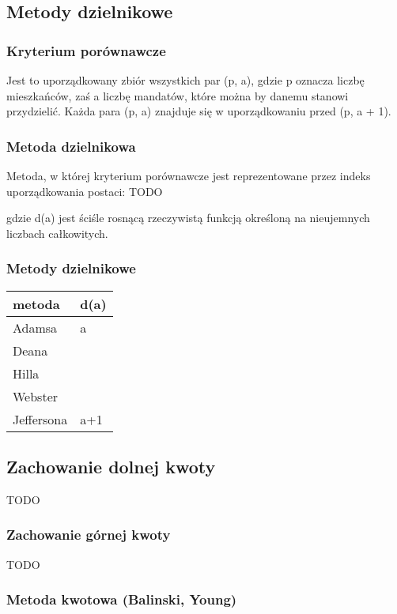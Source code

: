 \documentclass[12pt,a4paper]{article}
\begin{document}
\subsection{Metody dzielnikowe}
\subsubsection{Kryterium porównawcze}
Jest to uporządkowany zbiór wszystkich par (p, a), gdzie p oznacza liczbę mieszkańców, zaś a liczbę mandatów, które można by danemu stanowi przydzielić. Każda para (p, a) znajduje się w uporządkowaniu przed (p, a + 1).
\subsubsection{Metoda dzielnikowa}
Metoda, w której kryterium porównawcze jest reprezentowane przez indeks uporządkowania postaci:
TODO

gdzie d(a) jest ściśle rosnącą rzeczywistą funkcją określoną na nieujemnych liczbach całkowitych.

\subsubsection{Metody dzielnikowe}
\begin{center}
    \begin{tabular}{ | l  |l |}
    \hline
    metoda  & d(a) \\ \hline
    Adamsa & a \\ \hline
    Deana& \\ \hline
    Hilla & \\ \hline
    Webster & \\ \hline
    Jeffersona& a+1 \\ \hline
    
    \end{tabular}
\end{center}
\subsection{Zachowanie dolnej kwoty} TODO
\subsubsection{Zachowanie górnej kwoty} TODO
\subsubsection{Metoda kwotowa (Balinski, Young)}
\end{document}
